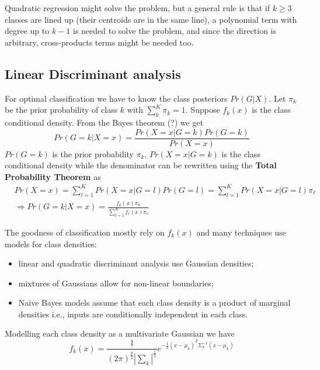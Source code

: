 Quadratic regression might solve the problem, but a general rule is that if $k\ge3$ classes are lined up (their centroids are in the same line), a polynomial term with degree up to $k-1$ is  needed to solve the problem, and since the direction is arbitrary, cross-products terms might be needed too.

\subsection{Linear Discriminant analysis}
\label{LDA}
For optimal classification we have to know the class posteriors $Pr\left( G|X\right)$. Let $\pi_k$ be the prior probability of class $k$ with $\sum_k^K \pi_k=1$. Suppose $f_k(x)$ is the class conditional density.
From the Bayes theorem (?) we get 
\begin{equation}
Pr\left( G=k | X=x\right) = \frac{Pr\left( X=x |G=k \right)Pr(G=k)}{Pr(X=x)}
\end{equation}
% 
$Pr(G=k)$ is the prior probability $\pi_k$, $Pr\left( X=x |G=k \right)$ is the class conditional density while the denominator can be rewritten using the \textbf{Total Probability Theorem} as
\begin{align}
&Pr(X=x) = \sum_{l=1}^{K} Pr(X=x|G=l) Pr(G=l) = \sum_{l=1}^{K} Pr(X=x|G=l) \pi_\ell\\
&\Rightarrow Pr\left( G=k | X=x\right) =\frac{f_k(x)\pi_k}{\sum_{l=1}^Kf_\ell(x)\pi_\ell}
\end{align}

The goodness of classification mostly rely on $f_k(x)$ and many techniques use models for class densities:
\begin{itemize}
\item linear and quadratic discriminant analysis use Gaussian densities;
\item mixtures of Gaussians allow for non-linear boundaries;
\item Naive Bayes models assume that each class density is a product of marginal densities i.e., inputs are conditionally independent in each class.
\end{itemize}
Modelling each class density as a multivariate Gaussian we have
\begin{equation}
f_k(x) = \frac{1}{(2\pi)^{\frac{p}{2}}|\sum_k|^{\frac{1}{2	}}} e^{-\frac{1}{2}\left( x-\mu_k\right)^T\Sigma_k^{-1}\left( x-\mu_k\right)}
\end{equation}

